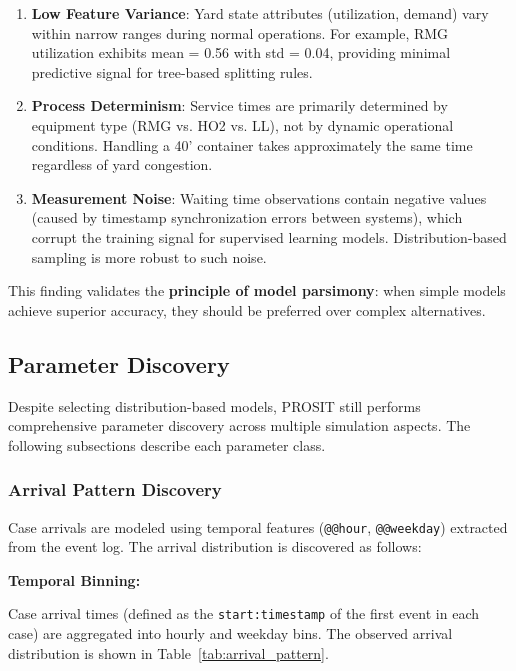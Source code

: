     \begin{enumerate}
        \item \textbf{Low Feature Variance}: Yard state attributes (utilization, demand) vary within narrow ranges during normal operations. For example, RMG utilization exhibits mean = 0.56 with std = 0.04, providing minimal predictive signal for tree-based splitting rules.
        
        \item \textbf{Process Determinism}: Service times are primarily determined by equipment type (RMG vs. HO2 vs. LL), not by dynamic operational conditions. Handling a 40' container takes approximately the same time regardless of yard congestion.
        
        \item \textbf{Measurement Noise}: Waiting time observations contain negative values (caused by timestamp synchronization errors between systems), which corrupt the training signal for supervised learning models. Distribution-based sampling is more robust to such noise.
    \end{enumerate}
    
    This finding validates the \textbf{principle of model parsimony}: when simple models achieve superior accuracy, they should be preferred over complex alternatives.

    \subsection{Parameter Discovery}
    
    Despite selecting distribution-based models, PROSIT still performs comprehensive parameter discovery across multiple simulation aspects. The following subsections describe each parameter class.

        \subsubsection{Arrival Pattern Discovery}
        
        Case arrivals are modeled using temporal features (\texttt{@@hour}, \texttt{@@weekday}) extracted from the event log. The arrival distribution is discovered as follows:
        
        \textbf{Temporal Binning:}
        
        Case arrival times (defined as the \texttt{start:timestamp} of the first event in each case) are aggregated into hourly and weekday bins. The observed arrival distribution is shown in Table~\ref{tab:arrival_pattern}.
        
